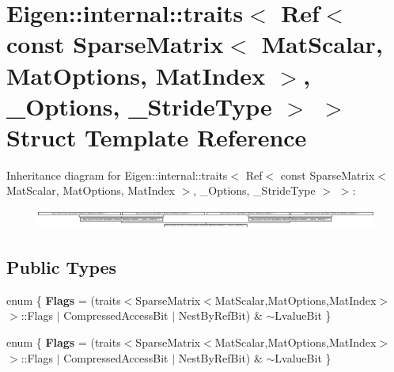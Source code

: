 \hypertarget{struct_eigen_1_1internal_1_1traits_3_01_ref_3_01const_01_sparse_matrix_3_01_mat_scalar_00_01_mat06d17b3f87cceb06f00332b993332271}{}\section{Eigen\+:\+:internal\+:\+:traits$<$ Ref$<$ const Sparse\+Matrix$<$ Mat\+Scalar, Mat\+Options, Mat\+Index $>$, \+\_\+\+Options, \+\_\+\+Stride\+Type $>$ $>$ Struct Template Reference}
\label{struct_eigen_1_1internal_1_1traits_3_01_ref_3_01const_01_sparse_matrix_3_01_mat_scalar_00_01_mat06d17b3f87cceb06f00332b993332271}
Inheritance diagram for Eigen\+:\+:internal\+:\+:traits$<$ Ref$<$ const Sparse\+Matrix$<$ Mat\+Scalar, Mat\+Options, Mat\+Index $>$, \+\_\+\+Options, \+\_\+\+Stride\+Type $>$ $>$\+:\begin{figure}[H]
\begin{center}
\leavevmode
\includegraphics[height=0.635401cm]{struct_eigen_1_1internal_1_1traits_3_01_ref_3_01const_01_sparse_matrix_3_01_mat_scalar_00_01_mat06d17b3f87cceb06f00332b993332271}
\end{center}
\end{figure}
\subsection*{Public Types}
\begin{DoxyCompactItemize}
\item 
\mbox{\label{struct_eigen_1_1internal_1_1traits_3_01_ref_3_01const_01_sparse_matrix_3_01_mat_scalar_00_01_mat06d17b3f87cceb06f00332b993332271_a6dc07faaa4925e6e3dbaeb4ac5f388d5}} 
enum \{ {\bfseries Flags} = (traits$<$Sparse\+Matrix$<$Mat\+Scalar,Mat\+Options,Mat\+Index$>$ $>$\+:\+:Flags $\vert$ Compressed\+Access\+Bit $\vert$ Nest\+By\+Ref\+Bit) \& $\sim$\+Lvalue\+Bit
 \}
\item 
\mbox{\label{struct_eigen_1_1internal_1_1traits_3_01_ref_3_01const_01_sparse_matrix_3_01_mat_scalar_00_01_mat06d17b3f87cceb06f00332b993332271_a0868bf6e28bca2203489191bef3e1ad6}} 
enum \{ {\bfseries Flags} = (traits$<$Sparse\+Matrix$<$Mat\+Scalar,Mat\+Options,Mat\+Index$>$ $>$\+:\+:Flags $\vert$ Compressed\+Access\+Bit $\vert$ Nest\+By\+Ref\+Bit) \& $\sim$\+Lvalue\+Bit
 \}
\end{DoxyCompactItemize}


